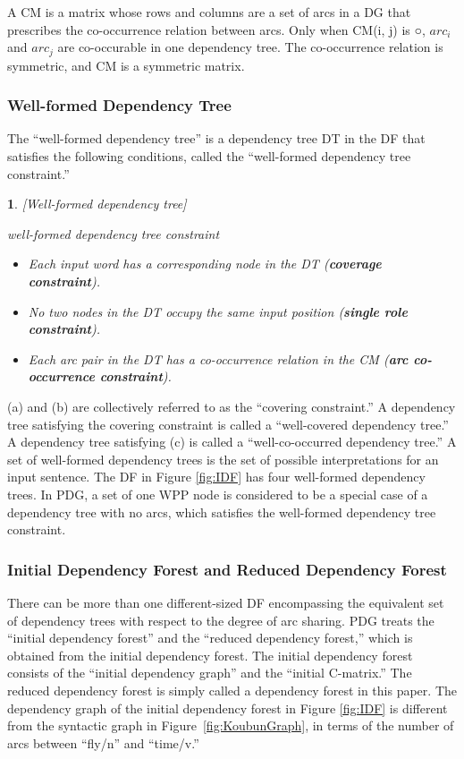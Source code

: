 \documentclass[english]{jnlp_1.4_rep}
\theoremstyle{break}
\theoremstyle{plain}
\theoremstyle{plain}
\newtheorem{definition}{}
\begin{document}
A CM is a matrix whose rows and columns are a set of arcs in a DG that
prescribes the co-occurrence relation between arcs. Only when CM(i, j)
is ○, $arc_i$ and $arc_j$ are co-occurable in one dependency
tree. The co-occurrence relation is symmetric, and CM is a symmetric
matrix.


\subsubsection{Well-formed Dependency Tree}

The ``well-formed dependency tree'' is a dependency tree DT in the DF
that satisfies the following conditions, called the ``well-formed
dependency tree constraint.''

\begin{definition} \label{def:WellFormedDepTree} [Well-formed dependency tree]

\noindent
well-formed dependency tree constraint
\begin{itemize}
\item[(a)] Each input word has a corresponding node in the DT ({\bf coverage constraint}).
\item[(b)] No two nodes in the DT occupy the same input position ({\bf single role constraint}).
\item[(c)] Each arc pair in the DT has a co-occurrence relation in the CM ({\bf arc co-occurrence constraint}).
\end{itemize}
\end{definition}

\noindent
(a) and (b) are collectively referred to as the
``covering constraint.'' A dependency tree satisfying the covering
constraint is called a ``well-covered dependency tree.'' A dependency
tree satisfying (c) is called a ``well-co-occurred dependency tree.''
A set of well-formed dependency trees is the set of possible
interpretations for an input sentence. The DF in Figure \ref{fig:IDF} has
four well-formed dependency trees. In PDG, a set of one WPP node is
considered to be a special case of a dependency tree with no arcs, which
satisfies the well-formed dependency tree constraint.


\subsubsection{Initial Dependency Forest and Reduced Dependency Forest}

There can be more than one different-sized DF encompassing the
equivalent set of dependency trees with respect to the degree of arc
sharing. PDG treats the ``initial dependency forest'' and the
``reduced dependency forest,'' which is obtained from the initial
dependency forest. The initial dependency forest consists of the
``initial dependency graph'' and the ``initial C-matrix.'' The reduced
dependency forest is simply called a dependency forest in this
paper. The dependency graph of the initial dependency forest in
Figure \ref{fig:IDF} is different from the syntactic graph in
Figure~\ref{fig:KoubunGraph}, in terms of the number of arcs between
``fly/n'' and ``time/v.''
\end{document}
